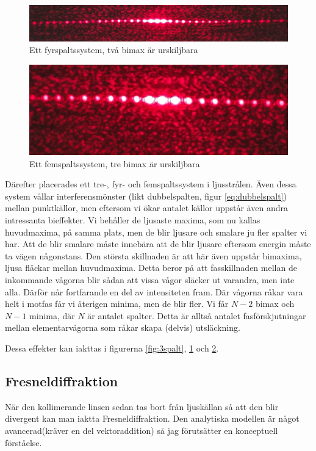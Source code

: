 \documentclass[a4paper]{article}
\begin{document}
\begin{figure}[h!]
	\centering
	\includegraphics[width=\textwidth]{4spalt2.jpg}
	\caption{Ett fyrspaltssystem, två bimax är urskiljbara}
	\label{fig:4spalt}
\end{figure}
\begin{figure}[h!]
	\centering
	\includegraphics[height=0.1\textheight]{5spalt.jpg}
	\caption{Ett femspaltssystem, tre bimax är urskiljbara}
	\label{fig:5spalt}
\end{figure}
Därefter placerades ett tre-, fyr- och femspaltssystem i ljusstrålen. Även dessa system vållar interferensmönster (likt dubbelspalten, figur \ref{eq:dubbelspalt}) 
mellan punktkällor, men eftersom vi ökar antalet källor uppstår även andra intressanta bieffekter. Vi behåller de ljusaste maxima, som nu kallas huvudmaxima, på
samma plats, men de blir ljusare och smalare ju fler spalter vi har. Att de blir smalare måste innebära att de blir ljusare eftersom energin måste ta vägen någonstans.
Den största skillnaden är att här även uppstår bimaxima, ljusa fläckar mellan huvudmaxima. Detta beror på att fasskillnaden mellan de inkommande vågorna blir sådan att vissa vågor släcker ut varandra, men inte alla. Därför når fortfarande en del av 
intensiteten fram. Där vågorna råkar vara helt i motfas får vi återigen minima, men de blir fler. Vi får $N-2$ bimax och $N-1$ minima, där $N$ är antalet spalter.
Detta är alltså antalet fasförskjutningar mellan elementarvågorna som råkar skapa (delvis) utsläckning. 

Dessa effekter kan iakttas i figurerna \ref{fig:3spalt}, \ref{fig:4spalt} och \ref{fig:5spalt}. 
\subsection{Fresneldiffraktion}
När den kollimerande linsen sedan tas bort från ljuskällan så att den blir divergent kan man iaktta Fresneldiffraktion. Den
analytiska modellen är något avancerad(kräver en del vektoraddition) så jag förutsätter en konceptuell förståelse. 
\end{document}
